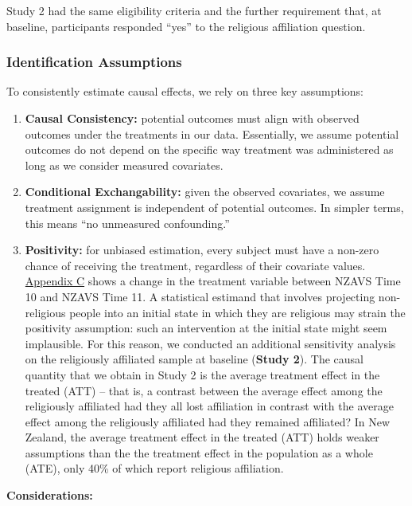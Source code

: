 \documentclass[
  singlecolumn]{article}
\begin{document}
Study 2 had the same eligibility criteria and the further requirement
that, at baseline, participants responded ``yes'' to the religious
affiliation question.

\subsubsection{Identification
Assumptions}\label{identification-assumptions}

To consistently estimate causal effects, we rely on three key
assumptions:

\begin{enumerate}
\def\labelenumi{\arabic{enumi}.}
\item
  \textbf{Causal Consistency:} potential outcomes must align with
  observed outcomes under the treatments in our data. Essentially, we
  assume potential outcomes do not depend on the specific way treatment
  was administered as long as we consider measured covariates.
\item
  \textbf{Conditional Exchangability:} given the observed covariates, we
  assume treatment assignment is independent of potential outcomes. In
  simpler terms, this means ``no unmeasured confounding.''
\item
  \textbf{Positivity:} for unbiased estimation, every subject must have
  a non-zero chance of receiving the treatment, regardless of their
  covariate values. \hyperref[appendix-exposures]{Appendix C} shows a
  change in the treatment variable between NZAVS Time 10 and NZAVS Time
  11. A statistical estimand that involves projecting non-religious
  people into an initial state in which they are religious may strain
  the positivity assumption: such an intervention at the initial state
  might seem implausible. For this reason, we conducted an additional
  sensitivity analysis on the religiously affiliated sample at baseline
  (\textbf{Study 2}). The causal quantity that we obtain in Study 2 is
  the average treatment effect in the treated (ATT) -- that is, a
  contrast between the average effect among the religiously affiliated
  had they all lost affiliation in contrast with the average effect
  among the religiously affiliated had they remained affiliated? In New
  Zealand, the average treatment effect in the treated (ATT) holds
  weaker assumptions than the the treatment effect in the population as
  a whole (ATE), only 40\% of which report religious affiliation.
\end{enumerate}

\textbf{Considerations:}
\end{document}
